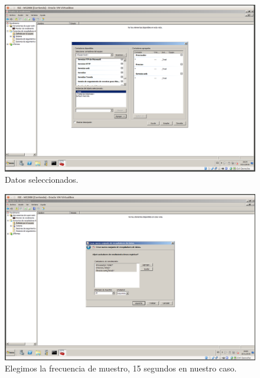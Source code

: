 \documentclass[a4paper,titlepage,12pt]{scrartcl}	%
\numberwithin{figure}{section} %
\numberwithin{table}{section} %
\begin{document}
	\begin{figure}[H]
		\centering
		\includegraphics[scale=0.27]{./Imagenes/5-5.png}
		\caption[Datos seleccionados.]{Datos seleccionados.}
		\label{5-5}
	\end{figure}
	
	\begin{figure}[H]
		\centering
		\includegraphics[scale=0.27]{./Imagenes/5-6.png}
		\caption[Elegimos la frecuencia de muestro, 15 segundos en nuestro caso.]{Elegimos la frecuencia de muestro, 15 segundos en nuestro caso.}
		\label{5-6}
	\end{figure}
	
\end{document}
